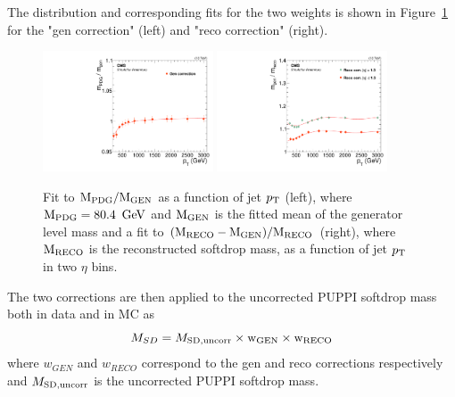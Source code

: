 The distribution and corresponding fits for the two weights is shown in Figure~\ref{fig:jmcfits} for the "gen correction" (left) and "reco correction" (right).
\begin{figure}[htbp]
\centering
\includegraphics[width=0.45\textwidth]{figures/analysis/search2/AN-16-235/plots/JMC_fit_gen.pdf}
\includegraphics[width=0.45\textwidth]{figures/analysis/search2/AN-16-235/plots/JMC_fit_reco.pdf}
\caption{Fit to $\rm{M_{PDG}/M_{GEN}}$ as a function of jet $p_{\mathrm{T}}$ (left), where $\rm{M_{PDG}}=80.4~\,\text{Ge\hspace{-.08em}V}$ and $\rm{M_{GEN}}$ is the fitted mean of the generator level mass and a fit to $\rm{(M_{RECO}-M_{GEN})/M_{RECO}}$ (right), where $\rm{M_{RECO}}$ is the reconstructed softdrop mass, as a function of jet $p_{\mathrm{T}}$ in two $\eta$ bins.}
\label{fig:jmcfits}
\end{figure}

The two corrections are then applied to the uncorrected PUPPI softdrop mass both in data and in MC as
\begin{equation}
M_{SD}=M_{\rm{SD, uncorr}} \times \rm{w_{GEN}} \times \rm{w_{RECO}}
\end{equation}
where $w_{GEN}$ and $w_{RECO}$ correspond to the gen and reco corrections respectively and $M_{\rm{SD, uncorr}}$ is the uncorrected PUPPI softdrop mass. \par


